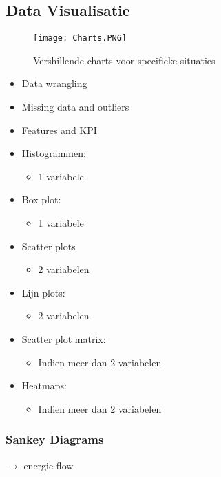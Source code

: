 \documentclass[12pt]{article}
\begin{document}
\subsection{Data Visualisatie}
\begin{figure}[t]
    \texttt{[image: Charts.PNG]}
    \caption{Vershillende charts voor specifieke situaties}
    \centering
\end{figure}
\begin{itemize}
    \item Data wrangling 
    \item Missing data and outliers 
    \item Features and KPI
\end{itemize}
\begin{itemize}
    \item Histogrammen:\begin{itemize}
        \item 1 variabele
    \end{itemize}
    \item Box plot:\begin{itemize}
        \item 1 variabele
    \end{itemize}
    \item Scatter plots\begin{itemize}
        \item 2 variabelen 
    \end{itemize}
    \item Lijn plots:\begin{itemize}
        \item 2 variabelen
    \end{itemize}
    \item Scatter plot matrix:\begin{itemize}
        \item Indien meer dan 2 variabelen
    \end{itemize}
    \item Heatmaps:\begin{itemize}
        \item Indien meer dan 2 variabelen
    \end{itemize}
\end{itemize}
\subsubsection{Sankey Diagrams}
$\rightarrow$ energie flow
\end{document}
